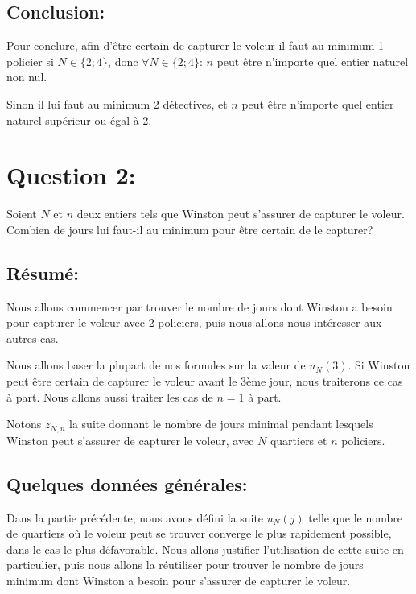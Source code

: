 \subsection{Conclusion:}
Pour conclure, afin d'être certain de capturer le voleur il faut au minimum 1 policier si $N\in\{2;4\}$, donc $\forall N\in\{2;4\}$: $n$ peut être n'importe quel entier naturel non nul.

\medskip

Sinon il lui faut au minimum 2 détectives, et $n$ peut être n'importe quel entier naturel supérieur ou égal à 2. 



\newpage
\section{Question 2:}
\begin{enonce}
Soient $N$ et $n$ deux entiers tels que Winston peut s'assurer de capturer le voleur. Combien de jours lui faut-il au minimum pour être certain de le capturer?
\end{enonce}
\subsection{Résumé:}
Nous allons commencer par trouver le nombre de jours dont Winston a besoin pour capturer le voleur avec 2 policiers, puis nous allons nous intéresser aux autres cas. 
\medskip

Nous allons baser la plupart de nos formules sur la valeur de $u_N(3)$. Si Winston peut être certain de capturer le voleur avant le 3ème jour, nous traiterons ce cas à part.
Nous allons aussi traiter les cas de $n=1$ à part.

\medskip

Notons $z_{N,n}$ la suite donnant le nombre de jours minimal pendant lesquels Winston peut s'assurer de capturer le voleur, avec $N$ quartiers et $n$ policiers.

\subsection{Quelques données générales:}
Dans la partie précédente, nous avons défini la suite $u_N(j)$ telle que le nombre de quartiers où le voleur peut se trouver converge le plus rapidement possible, dans le cas le plus défavorable. Nous allons justifier l'utilisation de cette suite en particulier, puis nous allons la réutiliser pour trouver le nombre de jours minimum dont Winston a besoin pour s'assurer de capturer le voleur.

